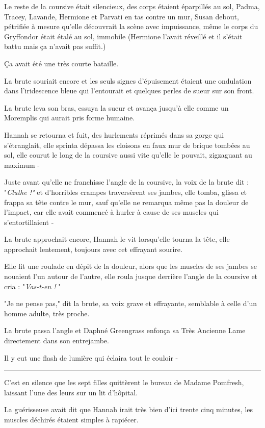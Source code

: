 Le reste de la coursive était silencieux, des corps étaient éparpillés au sol, Padma, Tracey, Lavande, Hermione et Parvati en tas contre un mur, Susan debout, pétrifiée à mesure qu'elle découvrait la scène avec impuissance, même le corps du Gryffondor était étalé au sol, immobile (Hermione l'avait réveillé et il s'était battu mais ça n'avait pas suffit.)

Ça avait été une très courte bataille.

La brute souriait encore et les seuls signes d'épuisement étaient une ondulation dans l'iridescence bleue qui l'entourait et quelques perles de sueur sur son front.

La brute leva son bras, essuya la sueur et avança jusqu'à elle comme un Moremplis qui aurait pris forme humaine.

Hannah se retourna et fuit, des hurlements réprimés dans sa gorge qui s'étranglait, elle sprinta dépassa les cloisons en faux mur de brique tombées au sol, elle courut le long de la coursive aussi vite qu'elle le pouvait, zigzaguant au maximum -

Juste avant qu'elle ne franchisse l'angle de la coursive, la voix de la brute dit : "\emph{Cluthe !" } et d'horribles crampes traversèrent ses jambes, elle tomba, glissa et frappa sa tête contre le mur, sauf qu'elle ne remarqua même pas la douleur de l'impact, car elle avait commencé à hurler à cause de ses muscles qui s'entortillaient -

La brute approchait encore, Hannah le vit lorsqu'elle tourna la tête, elle approchait lentement, toujours avec cet effrayant sourire.

Elle fit une roulade en dépit de la douleur, alors que les muscles de ses jambes se nouaient l'un autour de l'autre, elle roula jusque derrière l'angle de la coursive et cria : "\emph{Vas-t-en !} "

"Je ne pense pas," dit la brute, sa voix grave et effrayante, semblable à celle d'un homme adulte, très proche.

La brute passa l'angle et Daphné Greengrass enfonça sa Très Ancienne Lame directement dans son entrejambe.

Il y eut une flash de lumière qui éclaira tout le couloir -
\par\noindent\rule{\textwidth}{0.4pt}
C'est en silence que les sept filles quittèrent le bureau de Madame Pomfresh, laissant l'une des leurs sur un lit d'hôpital.

La guérisseuse avait dit que Hannah irait très bien d'ici trente cinq minutes, les muscles déchirés étaient simples à rapiécer.

